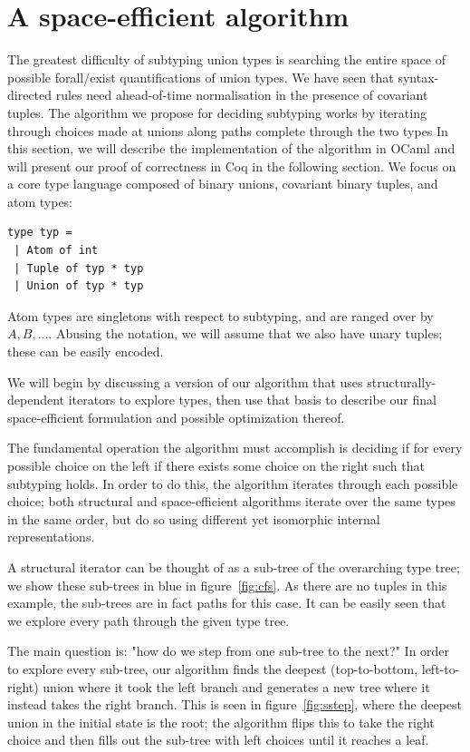 \documentclass[a4paper,english]{lipics-v2019}
\begin{document}
\section{A space-efficient algorithm}

The greatest difficulty of subtyping union types is searching the entire space
of possible forall/exist quantifications of union types. We have seen that
syntax-directed rules need ahead-of-time normalisation in the presence of
covariant tuples.
The algorithm we propose for deciding subtyping works by iterating through
choices made at unions along paths complete through the two types In this
section, we will describe the implementation of the algorithm in OCaml and
will present our proof of correctness in Coq in the following section.
We focus on a core type language composed of binary unions, covariant binary
tuples, and atom types:


\begin{lstlisting}
type typ =
 | Atom of int
 | Tuple of typ * typ
 | Union of typ * typ
\end{lstlisting}

Atom types are singletons with respect to subtyping, and are ranged
over by
\(A, B, ...\).  Abusing the
notation, we will assume that we also have unary
tuples; these can be easily encoded. 


We will begin by discussing a version of our algorithm that uses structurally-
dependent iterators to explore types, then use that basis to describe our
final space-efficient formulation and possible optimization thereof. 

The fundamental operation the algorithm must accomplish is deciding if
for every possible choice on the left if there exists some choice on the
right such that subtyping holds. In order to do this, the algorithm iterates
through each possible choice; both structural and space-efficient algorithms
iterate over the same types in the same order, but do so using different yet 
isomorphic internal representations.

A structural iterator can be thought of as a sub-tree of the overarching type
tree; we show these sub-trees in blue in figure~\ref{fig:cfs}. As there are no
tuples in this example, the sub-trees are in fact paths for this case. It can
be easily seen that we explore every path through the given type tree.

The main question is: "how do we step from one sub-tree to the next?" In order
to explore every sub-tree, our algorithm finds the deepest (top-to-bottom,
left-to-right) union where it took the left branch and generates a new tree
where it instead takes the right branch. This is seen in
figure~\ref{fig:sstep}, where the deepest union in the initial state is the
root; the algorithm flips this to take the right choice and then fills out the
sub-tree with left choices until it reaches a  leaf.
\end{document}
